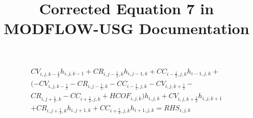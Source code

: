 \documentclass[11pt]{article} %
\title{Corrected Equation 7 in MODFLOW-USG Documentation}
\author{}
\begin{document}
\maketitle
\begin{equation}
\label{eqn7}
\begin{split}
CV_{i,j,k-\frac{1}{2}}h_{i,j,k-1} + CR_{i,j-\frac{1}{2},k}h_{i,j-1,k} + CC_{i-\frac{1}{2},j,k}h_{i-1,j,k} + \\
( -CV_{i,j,k-\frac{1}{2}} - CR_{i,j-\frac{1}{2},k} - CC_{i-\frac{1}{2},j,k}  - CV_{i,j,k+\frac{1}{2}} - \\
CR_{i,j+\frac{1}{2},k} - CC_{i+\frac{1}{2},j,k} + HCOF_{i,j,k} ) h_{i,j,k} + CV_{i,j,k+\frac{1}{2}}h_{i,j,k+1} \\
 + CR_{i,j+\frac{1}{2},k}h_{i,j+1,k} + CC_{i+\frac{1}{2},j,k}h_{i+1,j,k} = RHS_{i,j,k}
\end{split}
\end{equation}
\end{document}
